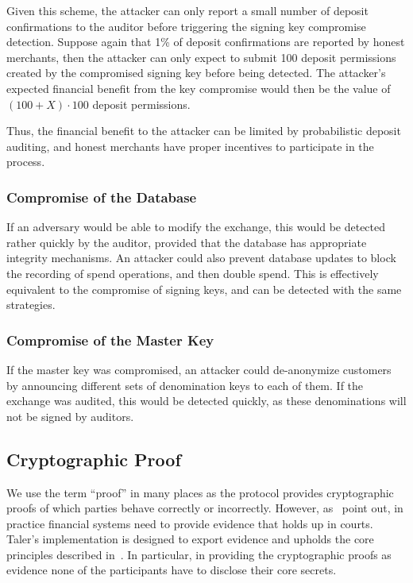 Given this scheme, the attacker can only report a small number of
deposit confirmations to the auditor before triggering the signing key
compromise detection.  Suppose again that 1\% of deposit confirmations
are reported by honest merchants, then the attacker can only expect to
submit 100 deposit permissions created by the compromised signing key
before being detected.  The attacker's expected financial benefit from
the key compromise would then be the value of $(100+X) \cdot 100$
deposit permissions.

Thus, the financial benefit to the attacker can be limited by
probabilistic deposit auditing, and honest merchants have proper
incentives to participate in the process.

\subsubsection{Compromise of the Database}

If an adversary would be able to modify the exchange, this would be detected
rather quickly by the auditor, provided that the database has appropriate
integrity mechanisms.  An attacker could also prevent database updates to block
the recording of spend operations, and then double spend.  This is effectively
equivalent to the compromise of signing keys, and can be detected with the same
strategies.

\subsubsection{Compromise of the Master Key}

If the master key was compromised, an attacker could de-anonymize customers by
announcing different sets of denomination keys to each of them.  If the
exchange was audited, this would be detected quickly, as these denominations
will not be signed by auditors.

\subsection{Cryptographic Proof}

We use the term ``proof'' in many places as the protocol provides cryptographic
proofs of which parties behave correctly or incorrectly. However,
as~\cite{fc2014murdoch} point out, in practice financial systems need to
provide evidence that holds up in courts.  Taler's implementation is designed
to export evidence and upholds the core principles described
in~\cite{fc2014murdoch}.  In particular, in providing the cryptographic proofs
as evidence none of the participants have to disclose their core secrets.

